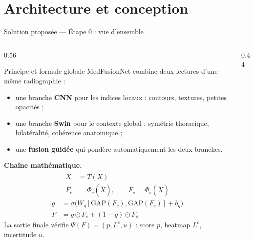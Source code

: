 \section{Architecture et conception}

\begin{frame}[t]{Solution proposée — Étape 0 : vue d'ensemble}
\vspace*{-0.18cm}
\begin{columns}[T,onlytextwidth]
\begin{column}{0.56\textwidth}
\scriptsize
\setlength{\abovedisplayskip}{3pt}
\setlength{\belowdisplayskip}{3pt}
\begin{block}{Principe et formule globale}
MedFusionNet combine deux lectures d'une même radiographie :
\begin{itemize}
\setlength{\itemsep}{0.15em}
\item une branche \textbf{CNN} pour les indices locaux : contours, textures, petites opacités ;
\item une branche \textbf{Swin} pour le contexte global : symétrie thoracique, bilatéralité, cohérence anatomique ;
\item une \textbf{fusion guidée} qui pondère automatiquement les deux branches.
\end{itemize}
\textbf{Chaîne mathématique.}
\[
\begin{aligned}
\tilde X &= T(X)\\
F_c &= \Phi_c(\tilde X), \qquad F_s = \Phi_s(\tilde X)
\end{aligned}
\]
\[
\begin{aligned}
g &= \sigma\!\big(W_g[\mathrm{GAP}(F_c),\mathrm{GAP}(F_s)] + b_g\big)\\
F &= g\odot F_c + (1-g)\odot F_s
\end{aligned}
\]
La sortie finale vérifie \(\Psi(F)=(p,L^c,u)\) : score $p$, heatmap $L^c$, incertitude $u$.
\end{block}
\end{column}
\begin{column}{0.44\textwidth}
\end{column}
\end{columns}
\end{frame}
